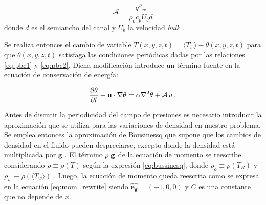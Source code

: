 $$\mathcal{A} = \frac{q''_w}{\rho_o  c_p U_b d} $$ 
donde $d$ es el semiancho del canal y $U_b$ la velocidad \textit{bulk} \cite{pope2001turbulent}.




Se realiza entonces el cambio de variable $T(x,y,z,t) = \langle T_w \rangle - \theta(x,y,z,t)$ para que $\theta(x,y,z,t)$ satisfaga las condiciones periódicas dadas por las relaciones \ref{eq:pbc1} y \ref{eq:pbc2}. Dicha modificación introduce un término fuente en la ecuación de conservación de energía:

\begin{equation}
\frac{ \partial \theta }{ \partial t } + \mathbf{u} \cdot \nabla \theta = \alpha \nabla^2 \theta + \mathcal{A} \hspace{0.5mm} u_x 
\label{eq:energy_pcb_source}
\end{equation}

Antes de discutir la periodicidad del campo de presiones es necesario introducir la aproximación que se utiliza para las variaciones de densidad en nuestro problema. Se emplea entonces la aproximación de Bousinessq que supone que los cambios de densidad en el fluido pueden despreciarse, excepto donde la densidad está multiplicada por $\mathbf{g}$ \cite{kundu}. El término $\rho \hspace{1mm} \mathbf{g}$ de la ecuación de momento se reescribe considerando $\rho \equiv \rho(T)$ según la expresión \ref{eq:bussinesq}, donde $\rho_o \equiv \rho(T_R)$ y $\rho_w \equiv \rho(\langle T_w \rangle)$ \cite{incropera}. Luego, la ecuación de momento queda reescrita como se expresa en la ecuación \ref{eq:mom_rewrite} siendo $\mathbf{\hat{e_g}}=(-1,0,0)$ y $C$ es una constante que no depende de $x$.


